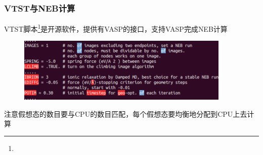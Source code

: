 \frame
{
	\frametitle{\textrm{VTST}与\textrm{NEB}计算}
	\textrm{VTST}脚本\footnote{\fontsize{6.2pt}{5.2pt}}是开源软件，提供有\textrm{VASP}的接口，支持\textrm{VASP}完成\textrm{NEB}计算%
\begin{figure}[h!]
\centering
\includegraphics[width=4.0in,viewport=0 0 630 200,clip]{Figures/Pt_NEB-INCAR.png}
\caption{\fontsize{6.2pt}{5.2pt}}%
\label{Pt_NEB-INCAR}
\end{figure}
注意假想态的数目要与\textrm{CPU}的数目匹配，每个假想态要均衡地分配到\textrm{CPU}上去计算%
}

